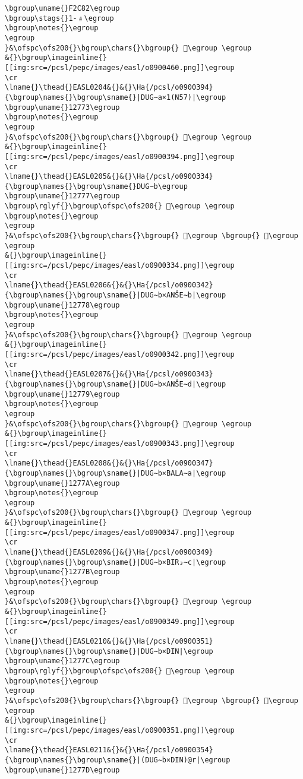 \begin{verbatim}
\bgroup\uname{}F2C82\egroup
\bgroup\stags{}1-﹟\egroup
\bgroup\notes{}\egroup
\egroup
}&\ofspc\ofs200{}\bgroup\chars{}\bgroup{} 󲲂\egroup \egroup
&{}\bgroup\imageinline{}[[img:src=/pcsl/pepc/images/easl/o0900460.png]]\egroup
\cr
\lname{}\thead{}EASL0204&{}&{}\Ha{/pcsl/o0900394}{\bgroup\names{}\bgroup\sname{}|DUG∼a×1(N57)|\egroup
\bgroup\uname{}12773\egroup
\bgroup\notes{}\egroup
\egroup
}&\ofspc\ofs200{}\bgroup\chars{}\bgroup{} 𒝳\egroup \egroup
&{}\bgroup\imageinline{}[[img:src=/pcsl/pepc/images/easl/o0900394.png]]\egroup
\cr
\lname{}\thead{}EASL0205&{}&{}\Ha{/pcsl/o0900334}{\bgroup\names{}\bgroup\sname{}DUG∼b\egroup
\bgroup\uname{}12777\egroup
\bgroup\rglyf{}\bgroup\ofspc\ofs200{} 𒝷\egroup \egroup
\bgroup\notes{}\egroup
\egroup
}&\ofspc\ofs200{}\bgroup\chars{}\bgroup{} 𒞭\egroup \bgroup{} 𒝷\egroup \egroup
&{}\bgroup\imageinline{}[[img:src=/pcsl/pepc/images/easl/o0900334.png]]\egroup
\cr
\lname{}\thead{}EASL0206&{}&{}\Ha{/pcsl/o0900342}{\bgroup\names{}\bgroup\sname{}|DUG∼b×ANŠE∼b|\egroup
\bgroup\uname{}12778\egroup
\bgroup\notes{}\egroup
\egroup
}&\ofspc\ofs200{}\bgroup\chars{}\bgroup{} 𒝸\egroup \egroup
&{}\bgroup\imageinline{}[[img:src=/pcsl/pepc/images/easl/o0900342.png]]\egroup
\cr
\lname{}\thead{}EASL0207&{}&{}\Ha{/pcsl/o0900343}{\bgroup\names{}\bgroup\sname{}|DUG∼b×ANŠE∼d|\egroup
\bgroup\uname{}12779\egroup
\bgroup\notes{}\egroup
\egroup
}&\ofspc\ofs200{}\bgroup\chars{}\bgroup{} 𒝹\egroup \egroup
&{}\bgroup\imageinline{}[[img:src=/pcsl/pepc/images/easl/o0900343.png]]\egroup
\cr
\lname{}\thead{}EASL0208&{}&{}\Ha{/pcsl/o0900347}{\bgroup\names{}\bgroup\sname{}|DUG∼b×BALA∼a|\egroup
\bgroup\uname{}1277A\egroup
\bgroup\notes{}\egroup
\egroup
}&\ofspc\ofs200{}\bgroup\chars{}\bgroup{} 𒝺\egroup \egroup
&{}\bgroup\imageinline{}[[img:src=/pcsl/pepc/images/easl/o0900347.png]]\egroup
\cr
\lname{}\thead{}EASL0209&{}&{}\Ha{/pcsl/o0900349}{\bgroup\names{}\bgroup\sname{}|DUG∼b×BIR₃∼c|\egroup
\bgroup\uname{}1277B\egroup
\bgroup\notes{}\egroup
\egroup
}&\ofspc\ofs200{}\bgroup\chars{}\bgroup{} 𒝻\egroup \egroup
&{}\bgroup\imageinline{}[[img:src=/pcsl/pepc/images/easl/o0900349.png]]\egroup
\cr
\lname{}\thead{}EASL0210&{}&{}\Ha{/pcsl/o0900351}{\bgroup\names{}\bgroup\sname{}|DUG∼b×DIN|\egroup
\bgroup\uname{}1277C\egroup
\bgroup\rglyf{}\bgroup\ofspc\ofs200{} 𒝼\egroup \egroup
\bgroup\notes{}\egroup
\egroup
}&\ofspc\ofs200{}\bgroup\chars{}\bgroup{} 𒞯\egroup \bgroup{} 𒝼\egroup \egroup
&{}\bgroup\imageinline{}[[img:src=/pcsl/pepc/images/easl/o0900351.png]]\egroup
\cr
\lname{}\thead{}EASL0211&{}&{}\Ha{/pcsl/o0900354}{\bgroup\names{}\bgroup\sname{}|(DUG∼b×DIN)@r|\egroup
\bgroup\uname{}1277D\egroup

\end{verbatim}

